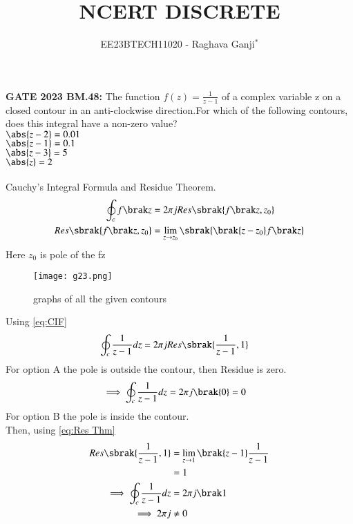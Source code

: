 \documentclass[journal,12pt,twocolumn]{IEEEtran}
\theoremstyle{remark}
\begin{document}

\vspace{3cm}

\title{NCERT DISCRETE}
\author{EE23BTECH11020 - Raghava Ganji$^{*}$%
}
\maketitle
\newpage
\bigskip

\renewcommand{\thefigure}{\theenumi}
\renewcommand{\thetable}{\theenumi}

\textbf{GATE 2023 BM.48:}
The function $f(z)=\frac{1}{z-1}$ of a complex variable z on a closed contour in an anti-clockwise direction.For which of the following contours, does this integral have a non-zero value?\\
$\abs{z-2}=0.01$\\
$\abs{z-1}=0.1$\\
$\abs{z-3}=5$\\
$\abs{z}=2$\\
\solution\\
Cauchy's Integral Formula and Residue Theorem.
\begin{align}
\oint_{c}f\brak z&=2\pi jRes\sbrak{f\brak z,z_0}\label{eq:CIF}\\
Res\sbrak{f\brak z,z_0}&=\lim_{z\to z_0}\sbrak{\brak{z-z_0}f\brak z}\label{eq:Res Thm}
\end{align}
Here $z_0$ is pole of the f\brak z\\
\begin{figure}[h!]
    \centering
    \texttt{[image: g23.png]}
    \caption{graphs of all the given contours}
\end{figure}
Using \eqref{eq:CIF}
\begin{align}
\oint_{c}\frac{1}{z-1}dz &=2\pi jRes\sbrak{\frac{1}{z-1},1}
\end{align}
For option A the pole is outside the contour, then Residue is zero.\\
\begin{align}
\implies\oint_{c}\frac{1}{z-1}dz &=2\pi j\brak{0}=0
\end{align}
For option B the pole is inside the contour.\\
Then, using \eqref{eq:Res Thm}
\begin{align}
Res\sbrak{\frac{1}{z-1},1} &=\lim_{z\to 1}\brak{z-1}\frac{1}{z-1}\\
&=1\\
\implies \oint_{c}\frac{1}{z-1}dz&=2\pi j\brak 1\\
\implies 2\pi j&\neq 0
\end{align}
\end{document}
